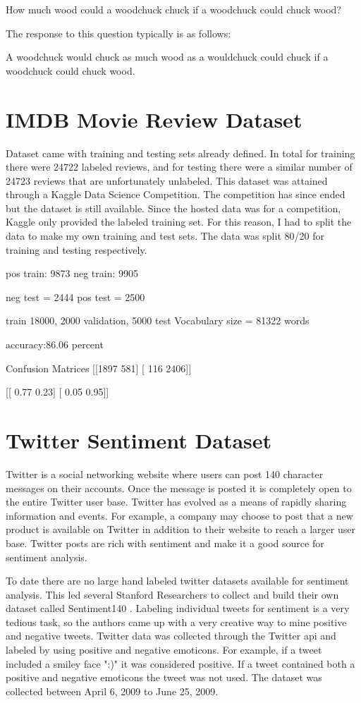 \documentclass[12pt]{article}
\begin{document}
How much wood could a woodchuck chuck if a woodchuck could chuck wood?

The response to this question typically is as follows:

A woodchuck would chuck as much wood as a wouldchuck could chuck if a woodchuck could chuck wood.

\section{IMDB Movie Review Dataset}
Dataset came with training and testing sets already defined. In total for training there were 24722 labeled reviews, and for testing there were a similar number of 24723 reviews that are unfortunately unlabeled. This dataset was attained through a Kaggle Data Science Competition. The competition has since ended but the dataset is still available. Since the hosted data was for a competition, Kaggle only provided the labeled training set. For this reason, I had to split the data to make my own training and test sets. The data was split 80\slash20 for training and testing respectively.

pos train: 9873
neg train: 9905

neg test = 2444
pos test = 2500

train 18000, 2000 validation, 5000 test
Vocabulary size = 81322 words

accuracy:86.06 percent

Confusion Matrices
[[1897  581]
[ 116 2406]]

[[ 0.77  0.23]
[ 0.05  0.95]]





\section{Twitter Sentiment Dataset}

Twitter is a social networking website \cite{twitter} where users can post 140 character messages on their accounts. Once the message is posted it is completely open to the entire Twitter user base. Twitter has evolved as a means of rapidly sharing information and events. For example, a company may choose to post that a new product is available on Twitter in addition to their website to reach a larger user base. Twitter posts are rich with sentiment and make it a good source for sentiment analysis.

To date there are no large hand labeled twitter datasets available for sentiment analysis. This led several Stanford Researchers \cite{Go_Bhayani_Huang_2009} to collect and build their own dataset called Sentiment140 \cite{sentiment140}. Labeling individual tweets for sentiment is a very tedious task, so the authors came up with a very creative way to mine positive and negative tweets. Twitter data was collected through the Twitter \ac{api} and labeled by using positive and negative emoticons. For example, if a tweet included a smiley face ":)" it was considered positive. If a tweet contained both a positive and negative emoticons the tweet was not used. The dataset was collected between April 6, 2009 to June 25, 2009.
\end{document}
